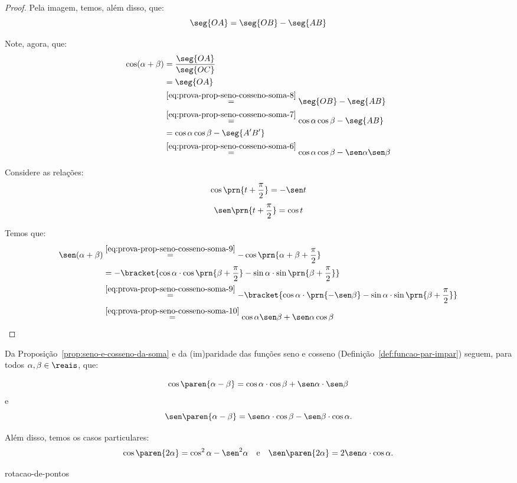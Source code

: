 \begin{proof}
    Pela imagem, temos, além disso, que:
    \begin{equation}
    \label{eq:prova-prop-seno-cosseno-soma-8}
        \seg{OA} = \seg{OB} - \seg{AB}
    \end{equation}


    Note, agora, que:
    \begin{align*}
        \cos(\alpha + \beta) &= \frac{\seg{OA}}{\seg{OC}} \\
        &= \seg{OA} \\
        &\stackrel{\ref{eq:prova-prop-seno-cosseno-soma-8}}{=} \seg{OB} - \seg{AB} \\
        &\stackrel{\ref{eq:prova-prop-seno-cosseno-soma-7}}{=}  \cos \alpha \cos \beta - \seg{AB} \\
        &= \cos \alpha \cos \beta - \seg{A^{\prime}B^{\prime}} \\
        &\stackrel{\ref{eq:prova-prop-seno-cosseno-soma-6}}{=}  \cos \alpha \cos \beta - \sen \alpha \sen \beta
    \end{align*}

    Considere as relações:
    \begin{equation}
    \label{eq:prova-prop-seno-cosseno-soma-9}
        \cos\prn{t+\frac \pi 2} = -\sen t
    \end{equation}
    \begin{equation}
    \label{eq:prova-prop-seno-cosseno-soma-10}
        \sen\prn{t+\frac \pi 2} = \cos t
    \end{equation}

    Temos que:
    \begin{align*}
        \sen(\alpha + \beta ) & \stackrel{\ref{eq:prova-prop-seno-cosseno-soma-9}}{=} -\cos\prn{\alpha + \beta + \frac \pi 2} \\
        & = -\bracket{\cos \alpha\cdot \cos\prn{\beta + \frac \pi 2} - \sin \alpha \cdot \sin\prn{\beta + \frac \pi 2}}\\
        &\stackrel{\ref{eq:prova-prop-seno-cosseno-soma-9}}{=} -\bracket{\cos \alpha\cdot \prn{-\sen \beta} - \sin \alpha \cdot \sin\prn{\beta + \frac \pi 2}}\\
        &\stackrel{\ref{eq:prova-prop-seno-cosseno-soma-10}}{=} \cos \alpha \sen \beta + \sen \alpha \cos \beta
    \end{align*}
    


\end{proof}

\begin{remark}
    Da Proposição~\ref{prop:seno-e-cosseno-da-soma} e da (im)paridade das funções seno e cosseno 
    (Definição~\ref{def:funcao-par-impar}) seguem, para todos $\alpha, \beta \in \reais$, que:

$$\cos \paren{\alpha - \beta} = \cos \alpha \cdot \cos \beta + \sen
\alpha \cdot \sen \beta$$ e
$$\sen \paren{\alpha - \beta} = \sen \alpha \cdot \cos \beta - \sen \beta \cdot
\cos \alpha.$$

Além disso, temos os casos particulares:
$$\cos \paren{2\alpha } = \cos^2 \alpha  - \sen^2 \alpha \ \ \text{ e }
\ \ \sen \paren{2\alpha } = 2\sen \alpha \cdot \cos \alpha.$$
\end{remark}

{rotacao-de-pontos}